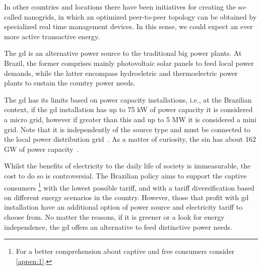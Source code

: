 

In other countries and locations there have been initiatives for creating the so-called nanogrids, in which an optimized peer-to-peer topology \cite{MAGNASCO2016369} can be obtained by specialized real time management devices.
In this sense, we could expect an ever more active transactive energy.




The \gls{gd} is an alternative power source to the traditional big power plants.
At Brazil, the former comprises mainly photovoltaic solar panels to feed local power demands, while the latter encompass hydroeletric and thermoelectric power plants to sustain the country power needs.

The \gls{gd} has its limits based on power capacity installations, i.e., at the Brazilian context, if the \gls{gd} installation has up to 75 kW of power capacity it is considered a micro grid, however if greater than this and up to 5 MW it is considered a mini grid.
Note that it is independently of the source type and must be connected to the local power distribution grid~\cite{GD}.
As a matter of curiosity, the \gls{sin} has about 162 GW of power capacity~\cite{BIG2}.

Whilst the benefits of electricity to the daily life of society is immeasurable, the cost to do so is controversial.
The Brazilian policy aims to support the captive consumers%
\footnote{For a better comprehension about captive and free consumers consider \autoref{appen:1}.}
with the lowest possible tariff, and with a tariff diversification based on different energy scenarios in the country.
However, those that profit with \gls{gd} installation have an additional option of power source and electricity tariff to choose from.
No matter the reasons, if it is greener or a look for energy independence, the \gls{gd} offers an alternative to feed distinctive power needs.

